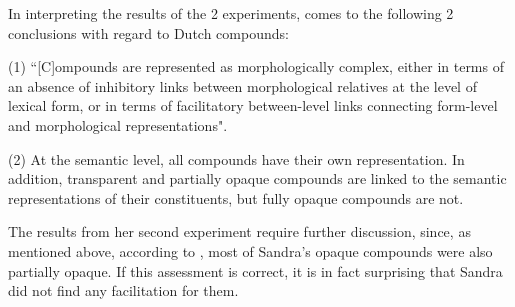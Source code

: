 In interpreting the results of the 2 experiments, \citet[365]{Zwitserlood:1994} comes to the following 2 conclusions with regard to Dutch compounds:
\begin{inparaenum}
\item[(1)] ``[C]om\-pounds are represented as morphologically complex,
  either in terms of an absence of inhibitory links between
  morphological relatives at the level of lexical form, or in terms of
  facilitatory between-level links connecting form-level and
  morphological representations".
\item[(2)] At the semantic level, all compounds have their own
  representation. In addition, transparent and partially opaque
  compounds are linked to the semantic representations of their
  constituents, but fully opaque compounds are not.
\end{inparaenum}

The results from her second experiment require further discussion,
since, as mentioned above, according to \citet[363]{Zwitserlood:1994},  most of Sandra's
opaque compounds were also partially opaque. If this assessment is
correct, it is in fact surprising that Sandra did not find any
facilitation for them.\label{ZwitserloodOnSandraOO-2}

